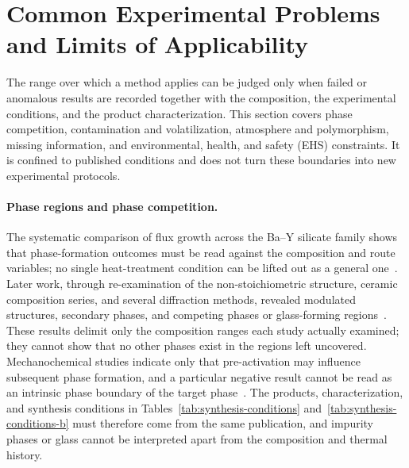 \section{Common Experimental Problems and Limits of Applicability}
\label{sec:failure-boundaries}

The range over which a method applies can be judged only when failed or anomalous results are recorded together with the composition, the experimental conditions, and the product characterization. This section covers phase competition, contamination and volatilization, atmosphere and polymorphism, missing information, and environmental, health, and safety (EHS) constraints. It is confined to published conditions and does not turn these boundaries into new experimental protocols.

\paragraph{Phase regions and phase competition.}
The systematic comparison of flux growth across the Ba--Y silicate family shows that phase-formation outcomes must be read against the composition and route variables; no single heat-treatment condition can be lifted out as a general one~\cite{wierzbickawieczorek2017high}. Later work, through re-examination of the non-stoichiometric structure, ceramic composition series, and several diffraction methods, revealed modulated structures, secondary phases, and competing phases or glass-forming regions~\cite{yamane2024synthesis,yamane2024microstructure,gulay2024navigation}. These results delimit only the composition ranges each study actually examined; they cannot show that no other phases exist in the regions left uncovered. Mechanochemical studies indicate only that pre-activation may influence subsequent phase formation, and a particular negative result cannot be read as an intrinsic phase boundary of the target phase~\cite{tzvetkov2001effects}. The products, characterization, and synthesis conditions in Tables~\ref{tab:synthesis-conditions} and~\ref{tab:synthesis-conditions-b} must therefore come from the same publication, and impurity phases or glass cannot be interpreted apart from the composition and thermal history.

